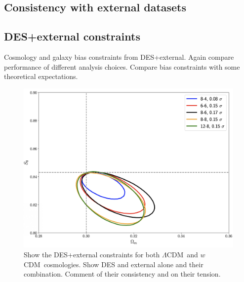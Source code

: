 \documentclass[fleqn,usenatbib]{mnras}
\newcommand{\lcdm}{$\Lambda$CDM}
\newcommand{\wcdm}{$w$CDM}
\begin{document}
\subsection{Consistency with external datasets}

\subsection{DES+external constraints}

Cosmology and galaxy bias constraints from DES+external. Again compare performance of different analysis choices. Compare bias constraints with some theoretical expectations.

\begin{figure}
\includegraphics[width=\columnwidth,draft]{figs/temp.png}
\caption[]{Show the DES+external constraints for both \lcdm \ and \wcdm \ cosmologies. Show DES and external alone and their combination. Comment of their consistency and on their tension. }
\label{fig:bias_relation}
\end{figure}
\end{document}
